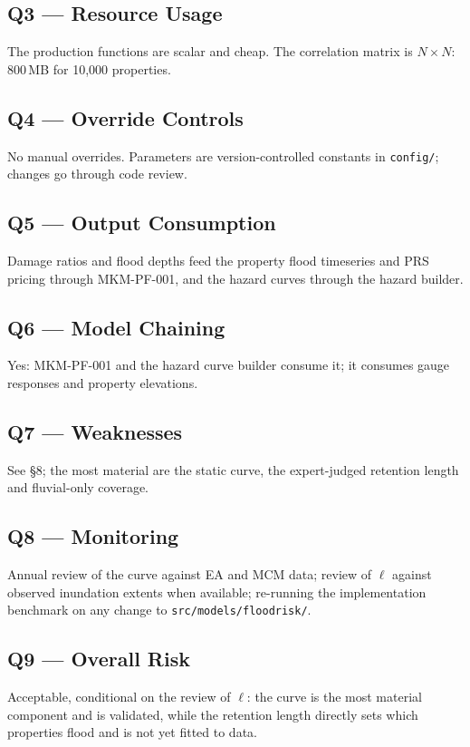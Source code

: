 \documentclass[11pt,a4paper]{article}
\begin{document}
\subsection{Q3 --- Resource Usage}
The production functions are scalar and cheap. The correlation matrix is $N\times N$:
800\,MB for 10{,}000 properties.

\subsection{Q4 --- Override Controls}
No manual overrides. Parameters are version-controlled constants in \texttt{config/};
changes go through code review.

\subsection{Q5 --- Output Consumption}
Damage ratios and flood depths feed the property flood timeseries and PRS pricing
through MKM-PF-001, and the hazard curves through the hazard builder.

\subsection{Q6 --- Model Chaining}
Yes: MKM-PF-001 and the hazard curve builder consume it; it consumes gauge responses
and property elevations.

\subsection{Q7 --- Weaknesses}
See \S8; the most material are the static curve, the expert-judged retention length
and fluvial-only coverage.

\subsection{Q8 --- Monitoring}
Annual review of the curve against EA and MCM data; review of $\ell$ against observed
inundation extents when available; re-running the implementation benchmark on any
change to \texttt{src/models/floodrisk/}.

\subsection{Q9 --- Overall Risk}
Acceptable, conditional on the review of $\ell$: the curve is the most material
component and is validated, while the retention length directly sets which properties
flood and is not yet fitted to data.
\end{document}
